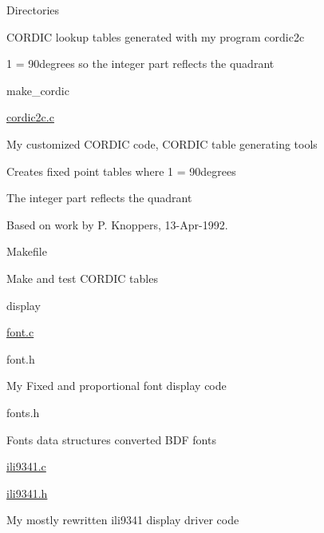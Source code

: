 \begin{DoxyParagraph}{Directories}
\begin{DoxyItemize}
\begin{DoxyItemize}
\begin{DoxyItemize}
\item C\-O\-R\-D\-I\-C lookup tables generated with my program cordic2c
\item 1 = 90degrees so the integer part reflects the quadrant
\end{DoxyItemize}
\item make\-\_\-cordic
\begin{DoxyItemize}
\item \hyperlink{cordic2c_8c}{cordic2c.\-c}
\begin{DoxyItemize}
\item My customized C\-O\-R\-D\-I\-C code, C\-O\-R\-D\-I\-C table generating tools
\item Creates fixed point tables where 1 = 90degrees
\begin{DoxyItemize}
\item The integer part reflects the quadrant
\end{DoxyItemize}
\item Based on work by P. Knoppers, 13-\/\-Apr-\/1992.
\end{DoxyItemize}
\item Makefile
\begin{DoxyItemize}
\item Make and test C\-O\-R\-D\-I\-C tables
\end{DoxyItemize}
\end{DoxyItemize}
\end{DoxyItemize}
\item display
\begin{DoxyItemize}
\item \hyperlink{font_8c}{font.\-c}
\item font.\-h
\begin{DoxyItemize}
\item My Fixed and proportional font display code
\end{DoxyItemize}
\item fonts.\-h
\begin{DoxyItemize}
\item Fonts data structures converted B\-D\-F fonts
\end{DoxyItemize}
\item \hyperlink{ili9341_8c}{ili9341.\-c}
\item \hyperlink{ili9341_8h}{ili9341.\-h}
\begin{DoxyItemize}
\item My mostly rewritten ili9341 display driver code
\begin{DoxyItemize}

\end{DoxyItemize}
\end{DoxyItemize}
\end{DoxyItemize}
\end{DoxyItemize}
\end{DoxyParagraph}
